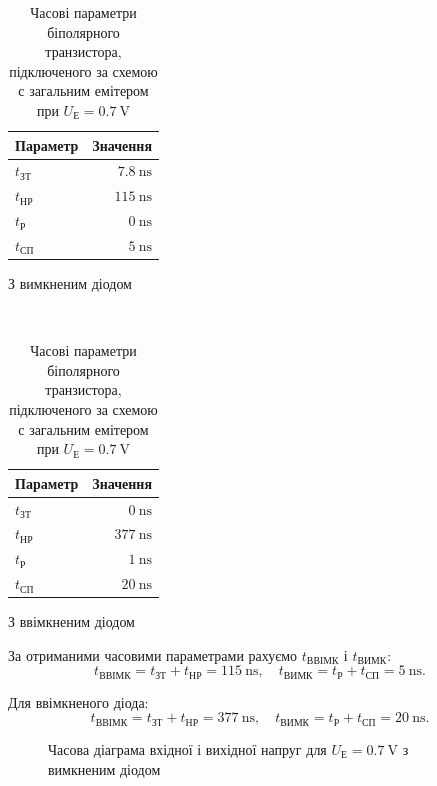 \documentclass[a4paper,oneside,DIV=10,12pt]{scrartcl}
\begin{document}
		\begin{table}[H]
		\centering
			\begin{subtable}[h]{0.4\textwidth}
			\centering
				\begin{tabular}{lr}
				\toprule
				Параметр & Значення\\
				\midrule
				$t_{\text{ЗТ}}$ & $\SI{7,8}{\nano\second}$\\
				$t_{\text{НР}}$ & $\SI{115}{\nano\second}$\\
				$t_{\text{Р}}$ & $\SI{0}{\nano\second}$\\
				$t_{\text{СП}}$ & $\SI{5}{\nano\second}$\\
				\bottomrule
				\end{tabular}
				\caption{З вимкненим діодом}
			\end{subtable}
			~
			\begin{subtable}[h]{0.4\textwidth}
			\centering
				\begin{tabular}{lr}
				\toprule
				Параметр & Значення\\
				\midrule
				$t_{\text{ЗТ}}$ & $\SI{0}{\nano\second}$\\
				$t_{\text{НР}}$ & $\SI{377}{\nano\second}$\\
				$t_{\text{Р}}$ & $\SI{1}{\nano\second}$\\
				$t_{\text{СП}}$ & $\SI{20}{\nano\second}$\\
				\bottomrule
				\end{tabular}
				\caption{З ввімкненим діодом}
			\end{subtable}
			
		\caption{Часові параметри біполярного транзистора, підключеного за схемою с загальним емітером при $U_{\text{Е}} = \SI{0,7}{\volt}$}
		\end{table}
		
		За отриманими часовими параметрами рахуємо $t_{\text{ВВІМК}}$ і $t_{\text{ВИМК}}$:
		\[
			t_{\text{ВВІМК}} = t_{\text{ЗТ}} + t_{\text{НР}} = \SI{115}{\nano\second}, \quad t_{\text{ВИМК}} = t_{\text{Р}} + t_{\text{СП}} = \SI{5}{\nano\second}.
		\]
		
		Для ввімкненого діода:
		\[
			t_{\text{ВВІМК}} = t_{\text{ЗТ}} + t_{\text{НР}} = \SI{377}{\nano\second}, \quad t_{\text{ВИМК}} = t_{\text{Р}} + t_{\text{СП}} = \SI{20}{\nano\second}.
		\]
		
		\begin{figure}[H]
		\label{fig:u0p7nodiode}
		\centering
			\def\svgwidth{\columnwidth}
			
		\caption{Часова діаграма вхідної і вихідної напруг для $U_{\text{Е}} = \SI{0,7}{\volt}$ з вимкненим діодом}
		\end{figure}
		
\end{document}
